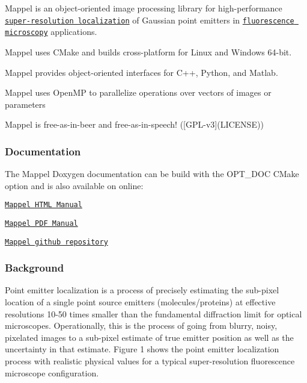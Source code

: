 Mappel is an object-\/oriented image processing library for high-\/performance \href{https://en.wikipedia.org/wiki/Super-resolution_microscopy#Localization_microscopy}{\tt super-\/resolution localization} of Gaussian point emitters in \href{https://en.wikipedia.org/wiki/Fluorescence_microscope#Sub-diffraction_techniques}{\tt fluorescence microscopy} applications.
\begin{DoxyItemize}
\item Mappel uses C\+Make and builds cross-\/platform for Linux and Windows 64-\/bit.
\item Mappel provides object-\/oriented interfaces for C++, Python, and Matlab.
\item Mappel uses Open\+MP to parallelize operations over vectors of images or parameters
\item Mappel is free-\/as-\/in-\/beer and free-\/as-\/in-\/speech! (\mbox{[}G\+P\+L-\/v3\mbox{]}(L\+I\+C\+E\+N\+SE))
\end{DoxyItemize}

\subsubsection*{Documentation}

The Mappel Doxygen documentation can be build with the {\ttfamily O\+P\+T\+\_\+\+D\+OC} C\+Make option and is also available on online\+:
\begin{DoxyItemize}
\item \href{https://markjolah.github.io/Mappel/index.html}{\tt Mappel H\+T\+ML Manual}
\item \href{https://markjolah.github.io/Mappel/pdf/Mappel-0.0.3-reference.pdf}{\tt Mappel P\+DF Manual}
\item \href{https://github.com/markjolah/Mappel}{\tt Mappel github repository}
\end{DoxyItemize}

\subsubsection*{Background}

Point emitter localization is a process of precisely estimating the sub-\/pixel location of a single point source emitters (molecules/proteins) at effective resolutions 10-\/50 times smaller than the fundamental diffraction limit for optical microscopes. Operationally, this is the process of going from blurry, noisy, pixelated images to a sub-\/pixel estimate of true emitter position as well as the uncertainty in that estimate. Figure 1 shows the point emitter localization process with realistic physical values for a typical super-\/resolution fluorescence microscope configuration.

